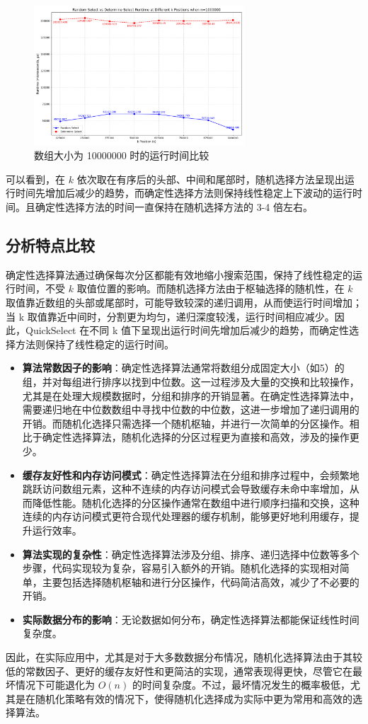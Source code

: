 \begin{figure}[H]
    \centering
    \includegraphics[width=0.7\textwidth]{../figure/10000000.png}
    \caption{数组大小为 10000000 时的运行时间比较}
\end{figure}

可以看到，在 $k$ 依次取在有序后的头部、中间和尾部时，随机选择方法呈现出运行时间先增加后减少的趋势，而确定性选择方法则保持线性稳定上下波动的运行时间。且确定性选择方法的时间一直保持在随机选择方法的 3-4 倍左右。

\subsection{分析特点比较}
确定性选择算法通过确保每次分区都能有效地缩小搜索范围，保持了线性稳定的运行时间，不受 $k$ 取值位置的影响。而随机选择方法由于枢轴选择的随机性，在 $k$ 取值靠近数组的头部或尾部时，可能导致较深的递归调用，从而使运行时间增加；当  k  取值靠近中间时，分割更为均匀，递归深度较浅，运行时间相应减少。因此，QuickSelect 在不同  k  值下呈现出运行时间先增加后减少的趋势，而确定性选择方法则保持了线性稳定的运行时间。
\begin{itemize}
    \item \textbf{算法常数因子的影响}：确定性选择算法通常将数组分成固定大小（如5）的组，并对每组进行排序以找到中位数。这一过程涉及大量的交换和比较操作，尤其是在处理大规模数据时，分组和排序的开销显著。在确定性选择算法中，需要递归地在中位数数组中寻找中位数的中位数，这进一步增加了递归调用的开销。而随机化选择只需选择一个随机枢轴，并进行一次简单的分区操作。相比于确定性选择算法，随机化选择的分区过程更为直接和高效，涉及的操作更少。
    \item \textbf{缓存友好性和内存访问模式}：确定性选择算法在分组和排序过程中，会频繁地跳跃访问数组元素，这种不连续的内存访问模式会导致缓存未命中率增加，从而降低性能。随机化选择的分区操作通常在数组中进行顺序扫描和交换，这种连续的内存访问模式更符合现代处理器的缓存机制，能够更好地利用缓存，提升运行效率。
    \item \textbf{算法实现的复杂性}：确定性选择算法涉及分组、排序、递归选择中位数等多个步骤，代码实现较为复杂，容易引入额外的开销。随机化选择的实现相对简单，主要包括选择随机枢轴和进行分区操作，代码简洁高效，减少了不必要的开销。
    \item \textbf{实际数据分布的影响}：无论数据如何分布，确定性选择算法都能保证线性时间复杂度。
\end{itemize}
因此，在实际应用中，尤其是对于大多数数据分布情况，随机化选择算法由于其较低的常数因子、更好的缓存友好性和更简洁的实现，通常表现得更快，尽管它在最坏情况下可能退化为 $O(n)$ 的时间复杂度。不过，最坏情况发生的概率极低，尤其是在随机化策略有效的情况下，使得随机化选择成为实际中更为常用和高效的选择算法。

